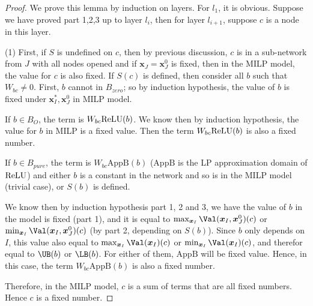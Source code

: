 				\begin{proof}
					We prove this lemma by induction on layers. For $l_1$, it is obvious. Suppose we have proved part 1,2,3 up to layer $l_i$, then for layer $l_{i+1}$, suppose $c$ is a node in this layer. 
					
					(1)	First, if $S$ is undefined on $c$, then by previous discussion, $c$ is in a sub-network from $J$ with all nodes opened and if $\boldsymbol{x}_J=\boldsymbol{x}_J^0$ is fixed, then in the MILP model, the value for $c$ is also fixed. If $S(c)$ is defined, then consider all $b$ such that $W_{bc}\neq 0$. First, $b$ cannot in $B_{zero}$; so by induction hypothesis, the value of $b$ is fixed under $\boldsymbol{x}^*_I,\boldsymbol{x}^0_J$ in MILP model. 
					
					
					
					If $b\in B_O$, the term is $W_{bc}\mathrm{ReLU}(b)$. We know then by induction hypothesis, the value for $b$ in MILP is a fixed value. Then the term $W_{bc}\mathrm{ReLU}(b)$ is also a fixed number.  
					
					If $b\in B_{pure}$, the term is $W_{bc}\mathrm{AppB}(b)$ ($\mathrm{AppB}$ is the LP approximation domain of $\mathrm{ReLU}$) and either $b$ is a constant in the network and so is in the MILP model (trivial case), or $S(b)$ is defined. 
					
					We know then by induction hypothesis part 1, 2 and 3,  we have the value of $b$ in the model is fixed (part 1), and it is equal to $\max_{\boldsymbol{x}_I} \Val(\boldsymbol{x}_I,\boldsymbol{x}^0_J)(c)$ or $\min_{\boldsymbol{x}_I} \Val(\boldsymbol{x}_I,\boldsymbol{x}^0_J)(c)$ (by part 2, depending on $S(b)$). Since $b$ only depends on $I$, this value also equal to $\max_{\boldsymbol{x}_I} \Val(\boldsymbol{x}_I)(c)$ or $\min_{\boldsymbol{x}_I} \Val(\boldsymbol{x}_I)(c)$, and therefor equal to $\UB(b)$ or $\LB(b)$. For either of them, $\mathrm{AppB}$ will be fixed value. Hence, in this case, the term $W_{bc}\mathrm{AppB}(b)$ is also a fixed number.
					
					Therefore, in the MILP model, $c$ is a sum of terms that are all fixed numbers. Hence $c$ is a fixed number.
					

\end{proof}
